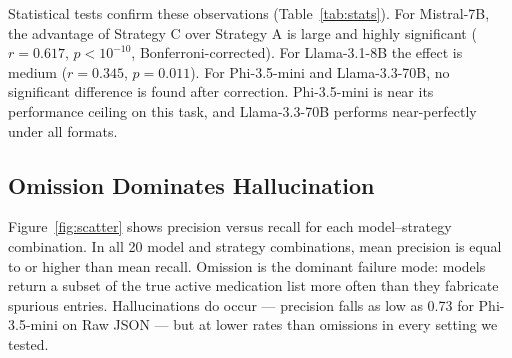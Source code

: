 Statistical tests confirm these observations (Table~\ref{tab:stats}). For Mistral-7B,
the advantage of Strategy C over Strategy A is large and highly significant
($r = 0.617$, $p < 10^{-10}$, Bonferroni-corrected). For Llama-3.1-8B the effect is
medium ($r = 0.345$, $p = 0.011$). For Phi-3.5-mini and Llama-3.3-70B, no significant
difference is found after correction. Phi-3.5-mini is near its performance ceiling on
this task, and Llama-3.3-70B performs near-perfectly under all formats.

\begin{table}[h]
\centering
\small
{}
\caption{Wilcoxon signed-rank tests. A vs C: Bonferroni-corrected ($k=4$).
  Significance: *** $p < 0.001$, * $p < 0.05$, ns not significant.
  $r = |Z| / \sqrt{N}$.}
\label{tab:stats}
\end{table}

\subsection{Omission Dominates Hallucination}
\label{sec:omission}

Figure~\ref{fig:scatter} shows precision versus recall for each model--strategy
combination. In all 20 model and strategy combinations, mean precision is equal to or
higher than mean recall. Omission is the dominant failure mode: models return a subset
of the true active medication list more often than they fabricate spurious entries.
Hallucinations do occur — precision falls as low as 0.73 for Phi-3.5-mini on Raw JSON
— but at lower rates than omissions in every setting we tested.

